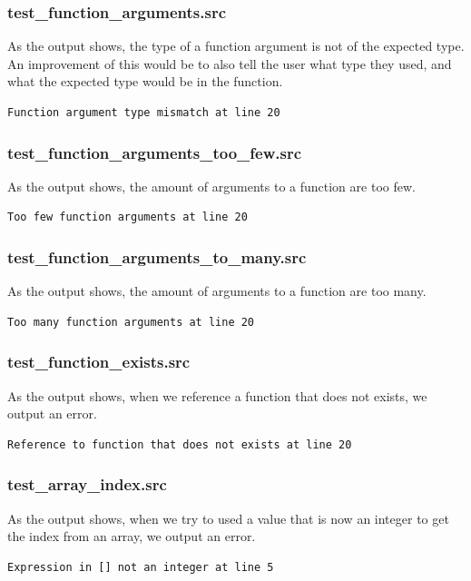 \documentclass[a4paper,10pt,titlepage]{report}
\begin{document}
\subsubsection{test\_function\_arguments.src}
As the output shows, the type of a function argument is not of the expected type. An improvement of this would be to also tell the user what type they used, and what the expected type would be in the function.
\begin{lstlisting}
Function argument type mismatch at line 20
\end{lstlisting}

\subsubsection{test\_function\_arguments\_too\_few.src}
As the output shows, the amount of arguments to a function are too few.
\begin{lstlisting}
Too few function arguments at line 20
\end{lstlisting}

\subsubsection{test\_function\_arguments\_to\_many.src}
As the output shows, the amount of arguments to a function are too many.
\begin{lstlisting}
Too many function arguments at line 20
\end{lstlisting}

\subsubsection{test\_function\_exists.src}
As the output shows, when we reference a function that does not exists, we output an error.
\begin{lstlisting}
Reference to function that does not exists at line 20
\end{lstlisting}

\subsubsection{test\_array\_index.src}
As the output shows, when we try to used a value that is now an integer to get the index from an array, we output an error.
\begin{lstlisting}
Expression in [] not an integer at line 5
\end{lstlisting}
\end{document}
